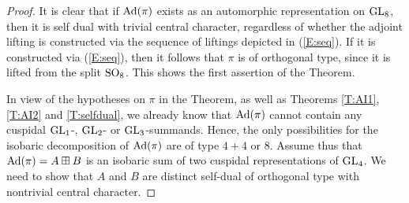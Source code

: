 \documentclass[11pt]{amsart}
\theoremstyle{plain}
\numberwithin{equation}{section}
\def\GL{{\rm GL}}
\def\SO{{\rm SO}}
\begin{document}
\begin{proof}
It is clear that if ${\rm Ad}(\pi)$ exists as an automorphic representation on $\GL_8$, then it is self dual with trivial central character, regardless of whether the adjoint lifting is constructed via the sequence of liftings depicted in (\ref{E:seq}). If it is constructed via (\ref{E:seq}), then it follows that $\pi$ is of orthogonal type, since it is lifted from the split $\SO_8$.  This shows the first assertion of the Theorem.
\vskip 5pt


In view of the hypotheses on $\pi$ in the Theorem, as well as  Theorems \ref{T:AI1}, \ref{T:AI2} and \ref{T:selfdual}, we already know that ${\rm Ad}(\pi)$ cannot contain any cuspidal $\GL_1$-, $\GL_2$- or $\GL_3$-summands. Hence, the only possibilities for the isobaric decomposition of ${\rm Ad}(\pi)$ are of type $4+4$ or $8$. 
Assume thus that ${\rm Ad}(\pi) = A \boxplus B$ is an isobaric sum of two  cuspidal representations of $\GL_4$. We need to show that $A$ and $B$ are distinct self-dual of orthogonal type with nontrivial central character. 
 \vskip 5pt
 

\end{proof}
\end{document}
